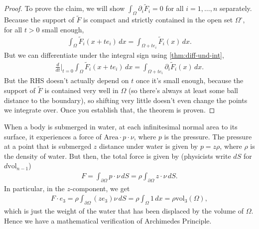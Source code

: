 \begin{proof}
	To prove the claim, we will show $ \int_{\Omega} \partial_{i}\tilde{F}_{i} = 0$ for all $i = 1, \dots, n$ separately. Because the support of $\tilde{F}$ is compact and strictly contained in the open set $ \Omega^{\circ }$, for all $t > 0$ small enough,
	\begin{align*}
		\int_{\Omega} \tilde{F}_{i}(x + t e_{i}) \, dx = \int_{\Omega + t e_{i}} \tilde{F}_{i}(x) \, dx.
	\end{align*}
	But we can differentiate under the integral sign using \ref{thm:diff-und-int},
	\begin{align*}
		\frac{d}{dt} \Big|_{t=0} \int_{\Omega} \tilde{F}_{i}(x + te_{i}) \, dx = \int_{\Omega+t e_{i}} \partial_{i} \tilde{F}_{i}(x) \, dx.
	\end{align*}
	But the RHS doesn't actually depend on $t$ once it's small enough, because the support of $\tilde{F}$ is contained very well in $\Omega$ (so there's always at least some ball distance to the boundary), so shifting very little doesn't even change the points we integrate over. Once you establish that, the theorem is proven.
\end{proof}

\begin{eg}
	When a body is submerged in water, at each infinitesimal normal area to its surface, it experiences a force of $\text{Area} \cdot p \cdot \nu$, where $p$ is the pressure. The pressure at a point that is submerged $z$ distance under water is given by $p = z \rho$, where $\rho$ is the density of water. But then, the total force is given by (physicists write $dS$ for $d \text{vol}_{n-1}$)
	\begin{align*}
		F = \int_{\partial \Omega} p \cdot \nu \, dS = \rho\int_{\partial\Omega} z \cdot \nu \, dS.
	\end{align*}
	In particular, in the $z$-component, we get
	\begin{align*}
		F \cdot e_{3} = \rho \int_{\partial \Omega} (z e_{3}) \nu \, dS = \rho \int_{\Omega} 1 \, dx = \rho \text{vol}_{3}(\Omega),
	\end{align*}
	which is just the weight of the water that has been displaced by the volume of $\Omega$. Hence we have a mathematical verification of Archimedes Principle.
\end{eg}

